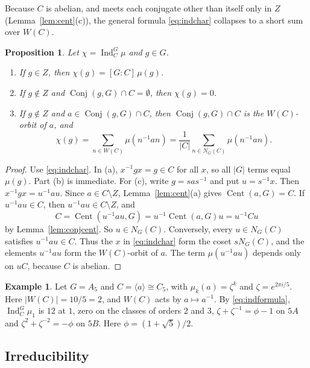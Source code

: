 \documentclass[12pt,letterpaper]{article}
\numberwithin{equation}{section}
\theoremstyle{plain}
\newtheorem{proposition}[theorem]{Proposition}
\theoremstyle{definition}
\newtheorem{example}[theorem]{Example}
\DeclareMathOperator{\Cent}{Cent}
\DeclareMathOperator{\Conj}{Conj}
\DeclareMathOperator{\Ind}{Ind}
\begin{document}
Because $C$ is abelian, and meets each conjugate other than itself only in
$Z$ (Lemma~\ref{lem:cent}(c)), the general formula \eqref{eq:indchar}
collapses to a short sum over $W(C)$.

\begin{proposition}\label{prop:indformula}
Let $\chi=\Ind_C^G\mu$ and $g\in G$.
\begin{enumerate}[label=(\alph*),itemsep=1pt]
\item If $g\in Z$, then $\chi(g)=[G:C]\,\mu(g)$.
\item If $g\notin Z$ and $\Conj(g,G)\cap C=\emptyset$, then $\chi(g)=0$.
\item If $g\notin Z$ and $a\in\Conj(g,G)\cap C$, then $\Conj(g,G)\cap C$ is
  the $W(C)$-orbit of $a$, and
  \begin{equation}\label{eq:indformula}
  \chi(g)=\sum_{n\in W(C)}\mu(n^{-1}an)
  =\frac{1}{|C|}\sum_{n\in N_G(C)}\mu(n^{-1}an).
  \end{equation}
\end{enumerate}
\end{proposition}

\begin{proof}
Use \eqref{eq:indchar}. In (a), $x^{-1}gx=g\in C$ for all $x$, so all
$|G|$ terms equal $\mu(g)$. Part (b) is immediate. For (c), write
$g=sas^{-1}$ and put $u=s^{-1}x$. Then $x^{-1}gx=u^{-1}au$. Since $a\in
C\setminus Z$, Lemma~\ref{lem:cent}(a) gives $\Cent(a,G)=C$. If
$u^{-1}au\in C$, then $u^{-1}au\in C\setminus Z$, and
\[
C=\Cent(u^{-1}au,G)=u^{-1}\Cent(a,G)u=u^{-1}Cu
\]
by Lemma~\ref{lem:conjcent}. So $u\in N_G(C)$. Conversely, every $u\in
N_G(C)$ satisfies $u^{-1}au\in C$. Thus the $x$ in \eqref{eq:indchar} form
the coset $sN_G(C)$, and the elements $u^{-1}au$ form the $W(C)$-orbit of
$a$. The term $\mu(u^{-1}au)$ depends only on $uC$, because $C$ is abelian.
\end{proof}

\begin{example}\label{ex:a5ind}
Let $G=A_5$ and $C=\langle a\rangle\cong C_5$, with $\mu_k(a)=\zeta^k$ and
$\zeta=e^{2\pi i/5}$. Here $|W(C)|=10/5=2$, and $W(C)$ acts by $a\mapsto
a^{-1}$. By \eqref{eq:indformula}, $\Ind_C^G\mu_1$ is $12$ at $1$, zero on
the classes of orders $2$ and $3$, $\zeta+\zeta^{-1}=\phi-1$ on $5A$ and
$\zeta^2+\zeta^{-2}=-\phi$ on $5B$. Here $\phi=(1+\sqrt5)/2$.
\end{example}

\subsection{Irreducibility}
\end{document}
